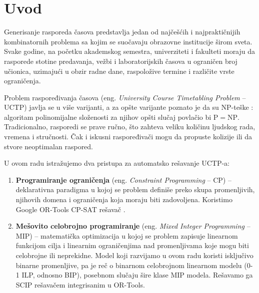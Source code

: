 \documentclass[12pt,oneside]{memoir}
\begin{document}
\frontmatter
\naslovna
\komisija
{}
\apstrakt
\tableofcontents*

\mainmatter

\chapter{Uvod}
\label{chp:uvod}

Generisanje rasporeda časova predstavlja jedan od najčešćih i najpraktičnijih
kombinatornih problema sa kojim se suočavaju obrazovne institucije širom sveta.
Svake godine, na početku akademskog semestra, univerziteti i fakulteti moraju
da rasporede stotine predavanja, vežbi i laboratorijskih časova u ograničen
broj učionica, uzimajući u obzir radne dane, raspoložive termine i različite
vrste ograničenja.

Problem raspoređivanja časova (eng. \emph{University Course Timetabling
Problem} -- UCTP) javlja se u više varijanti, a za opšte varijante
poznato je da su NP-teške \cite{even1975, garey1979}: algoritam
polinomijalne složenosti za njihov opšti slučaj povlačio bi
$\mathrm{P} = \mathrm{NP}$. Tradicionalno, rasporedi se prave ručno,
što zahteva veliku količinu ljudskog rada, vremena i stručnosti. Čak i
iskusni raspoređivači mogu da propuste kolizije ili da stvore
neoptimalan raspored.

U ovom radu istražujemo dva pristupa za automatsko rešavanje UCTP-a:

\begin{enumerate}
\item \textbf{Programiranje ograničenja} (eng. \emph{Constraint Programming}
  -- CP) -- deklarativna paradigma u kojoj se problem definiše preko skupa
  promenljivih, njihovih domena i ograničenja koja moraju biti zadovoljena.
  Koristimo Google OR-Tools CP-SAT rešavač \cite{ortools, cpsat2020}.

\item \textbf{Mešovito celobrojno programiranje} (eng. \emph{Mixed Integer
  Programming} -- MIP) -- matematička optimizacija u kojoj se problem
  zapisuje linearnom funkcijom cilja i linearnim ograničenjima nad
  promenljivama koje mogu biti celobrojne ili neprekidne. Model koji
  razvijamo u ovom radu koristi isključivo binarne promenljive, pa je
  reč o binarnom celobrojnom linearnom modelu (0-1 ILP, odnosno BIP),
  posebnom slučaju šire klase MIP modela. Rešavamo ga SCIP
  rešavačem \cite{scip2009} integrisanim u OR-Tools.
\end{enumerate}
\end{document}
